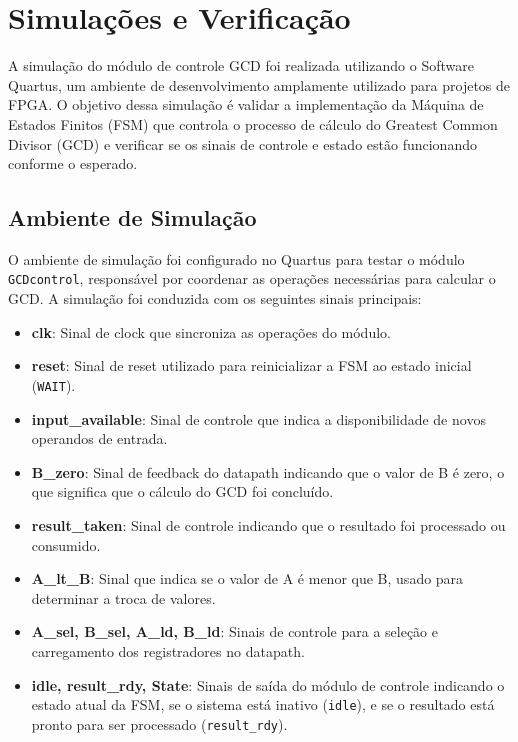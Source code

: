 \documentclass[a4paper,11pt]{article} %
\begin{document}
\section{Simulações e Verificação}

A simulação do módulo de controle GCD foi realizada
utilizando o Software Quartus, um ambiente de
desenvolvimento amplamente utilizado para projetos
de FPGA. O objetivo dessa simulação é validar a
implementação da Máquina de Estados Finitos (FSM)
que controla o processo de cálculo do Greatest
Common Divisor (GCD) e verificar se os sinais de
controle e estado estão funcionando conforme o
esperado.

\subsection{Ambiente de Simulação}
O ambiente de simulação foi configurado no Quartus para testar o módulo \texttt{GCDcontrol}, responsável por coordenar as operações necessárias para calcular o GCD. A simulação foi conduzida com os seguintes sinais principais:
\begin{itemize}
    \item \textbf{clk}: Sinal de clock que sincroniza as operações do módulo.
    \item \textbf{reset}: Sinal de reset utilizado para reinicializar a FSM ao estado inicial (\texttt{WAIT}).
    \item \textbf{input\_available}: Sinal de controle que indica a disponibilidade de novos operandos de entrada.
    \item \textbf{B\_zero}: Sinal de feedback do datapath indicando que o valor de B é zero, o que significa que o cálculo do GCD foi concluído.
    \item \textbf{result\_taken}: Sinal de controle indicando que o resultado foi processado ou consumido.
    \item \textbf{A\_lt\_B}: Sinal que indica se o valor de A é menor que B, usado para determinar a troca de valores.
    \item \textbf{A\_sel, B\_sel, A\_ld, B\_ld}: Sinais de controle para a seleção e carregamento dos registradores no datapath.
    \item \textbf{idle, result\_rdy, State}: Sinais de saída do módulo de controle indicando o estado atual da FSM, se o sistema está inativo (\texttt{idle}), e se o resultado está pronto para ser processado (\texttt{result\_rdy}).
\end{itemize}
\end{document}
